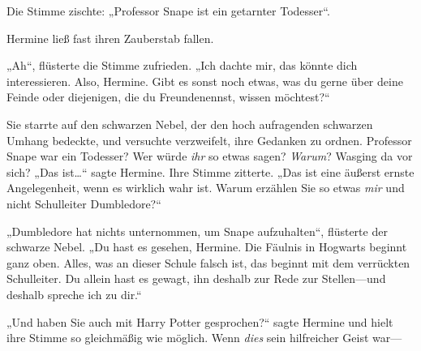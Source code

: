 Die Stimme zischte: „Professor Snape ist ein getarnter Todesser“.

Hermine ließ fast ihren Zauberstab fallen.

„Ah“, flüsterte die Stimme zufrieden. „Ich dachte mir, das könnte dich interessieren. Also, Hermine. Gibt es sonst noch etwas, was du gerne über deine Feinde oder diejenigen, die du Freundenennst, wissen möchtest?“

Sie starrte auf den schwarzen Nebel, der den hoch aufragenden schwarzen Umhang bedeckte, und versuchte verzweifelt, ihre Gedanken zu ordnen. Professor Snape war ein Todesser? Wer würde \emph{ihr} so etwas sagen? \emph{Warum}? Wasging da vor sich? „Das ist…“ sagte Hermine. Ihre Stimme zitterte. „Das ist eine äußerst ernste Angelegenheit, wenn es wirklich wahr ist. Warum erzählen Sie so etwas \emph{mir} und nicht Schulleiter Dumbledore?“

„Dumbledore hat nichts unternommen, um Snape aufzuhalten“, flüsterte der schwarze Nebel. „Du hast es gesehen, Hermine. Die Fäulnis in Hogwarts beginnt ganz oben. Alles, was an dieser Schule falsch ist, das beginnt mit dem verrückten Schulleiter. Du allein hast es gewagt, ihn deshalb zur Rede zur Stellen—und deshalb spreche ich zu dir.“

„Und haben Sie auch mit Harry Potter gesprochen?“ sagte Hermine und hielt ihre Stimme so gleichmäßig wie möglich. Wenn \emph{dies} sein hilfreicher Geist war—

